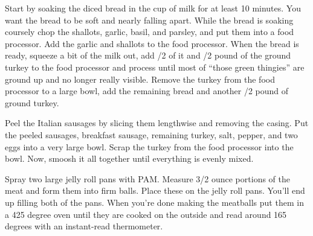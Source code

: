 

\begin{IngredientsAndSteps}
    {
        Start by soaking the diced bread in the cup of milk for at least 10 minutes. You want the bread to be
        soft and nearly falling apart. While the bread is soaking coursely chop the shallots, garlic, basil,
        and parsley, and put them into a food processor.  Add the garlic and shallots to the food processor.
        When the bread is ready, squeeze a bit of the milk out, add /2 of it and /2 pound
        of the ground turkey to the food processor and process until most of ``those green thingies'' are
        ground up and no longer really visible. Remove the turkey from the food processor to a large bowl, add the
        remaining bread and another /2 pound of ground turkey.

        Peel the Italian sausages by slicing them lengthwise and removing the casing. Put the peeled sausages,
        breakfast sausage, remaining turkey, salt, pepper, and two eggs into a very large bowl. Scrap the turkey
        from the food processor into the bowl. Now, smoosh it all together until everything is evenly mixed.

        Spray two large jelly roll pans with PAM. Measure 3/2 ounce portions of the meat and form them
        into firm balls. Place these on the jelly roll pans. You'll end up filling both of the pans. When you're done
        making the meatballs put them in a 425 degree oven until they are cooked on the outside and read around
        165 degrees with an instant-read thermometer.
    }


\end{IngredientsAndSteps}
